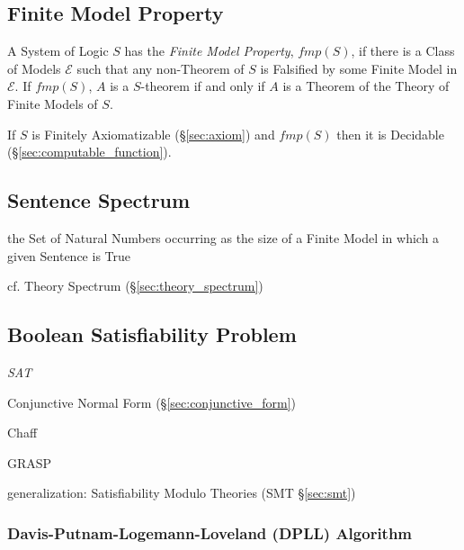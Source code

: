\subsection{Finite Model Property}\label{sec:finite_model_property}

A System of Logic $S$ has the \emph{Finite Model Property}, $fmp(S)$,
if there is a Class of Models $\mathcal{E}$ such that any non-Theorem
of $S$ is Falsified by some Finite Model in $\mathcal{E}$. If
$fmp(S)$, $A$ is a $S$-theorem if and only if $A$ is a Theorem of the
Theory of Finite Models of $S$.

If $S$ is Finitely Axiomatizable (\S\ref{sec:axiom}) and $fmp(S)$ then
it is Decidable (\S\ref{sec:computable_function}).



\subsection{Sentence Spectrum}\label{sec:sentence_spectrum}

the Set of Natural Numbers occurring as the size of a Finite Model in which a
given Sentence is True

cf. Theory Spectrum (\S\ref{sec:theory_spectrum})



\subsection{Boolean Satisfiability Problem}\label{sec:sat}

\emph{SAT}

Conjunctive Normal Form (\S\ref{sec:conjunctive_form})

Chaff

GRASP

generalization: Satisfiability Modulo Theories (SMT \S\ref{sec:smt})




\subsubsection{Davis-Putnam-Logemann-Loveland (DPLL) Algorithm}\label{sec:dpll}

